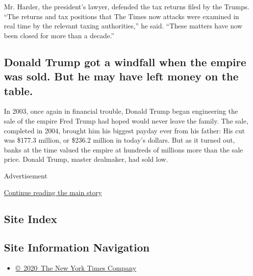 Mr. Harder, the president's lawyer, defended the tax returns filed by
the Trumps. ``The returns and tax positions that The Times now attacks
were examined in real time by the relevant taxing authorities,'' he
said. ``These matters have now been closed for more than a decade.''

\hypertarget{donald-trump-got-a-windfall-when-the-empire-was-sold-but-he-may-have-left-money-on-the-table}{%
\subsection{Donald Trump got a windfall when the empire was sold. But he
may have left money on the
table.}\label{donald-trump-got-a-windfall-when-the-empire-was-sold-but-he-may-have-left-money-on-the-table}}

In 2003, once again in financial trouble, Donald Trump began engineering
the sale of the empire Fred Trump had hoped would never leave the
family. The sale, completed in 2004, brought him his biggest payday ever
from his father: His cut was \$177.3 million, or \$236.2 million in
today's dollars. But as it turned out, banks at the time valued the
empire at hundreds of millions more than the sale price. Donald Trump,
master dealmaker, had sold low.

Advertisement

\protect\hyperlink{after-bottom}{Continue reading the main story}

\hypertarget{site-index}{%
\subsection{Site Index}\label{site-index}}

\hypertarget{site-information-navigation}{%
\subsection{Site Information
Navigation}\label{site-information-navigation}}

\begin{itemize}
\tightlist
\item
  \href{https://help.nytimes3xbfgragh.onion/hc/en-us/articles/115014792127-Copyright-notice}{©~2020~The
  New York Times Company}
\end{itemize}

